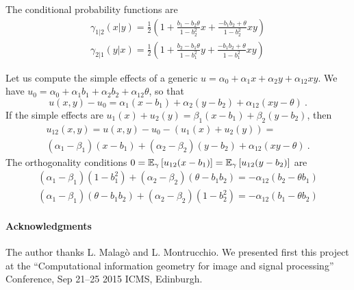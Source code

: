 \documentclass[runningheads]{llncs}
\begin{document}
The conditional probability functions are
\begin{gather*} \gamma_{1|2}(x|y) = \frac12 \left(1+\frac{b_1-b_2\theta}{1-b_2^2}x+\frac{-b_1b_2 + \theta}{1-b_2^2}xy\right) \\ \gamma_{2|1}(y|x) = \frac12 \left(1+\frac{b_2-b_1\theta}{1-b_1^2}y+\frac{-b_1b_2 + \theta}{1-b_1^2}xy\right) \end{gather*}

Let us compute the simple effects of a generic $u = \alpha_0 + \alpha_1 x + \alpha_2 y + \alpha_{12} xy$. We have $u_0 = \alpha_0 + \alpha_1 b_1 + \alpha_2 b_2 + \alpha_{12} \theta$, so that
\begin{equation*}
  u(x,y) - u_0 = \alpha_1 (x - b_1) + \alpha_2(y-b_2) + \alpha_{12} (xy - \theta) \ .
\end{equation*}
If the simple effects are $u_1(x) + u_2(y) = \beta_1 (x - b_1) + \beta_2(y-b_2)$, then
\begin{multline*}
  u_{12}(x,y) = u(x,y) - u_0 - (u_1(x) + u_2(y)) = \\ (\alpha_1-\beta_1)(x-b_1)+(\alpha_2-\beta_2)(y-b_2)+\alpha_{12}(xy-\theta) \ .  
\end{multline*}
The orthogonality conditions $0 = {\operatorname{\mathbb E}}_{\gamma}\left[u_{12}(x - b_1)\right] = {\operatorname{\mathbb E}}_{\gamma}\left[u_{12}(y-b_2)\right]$ are
\begin{gather*}
  (\alpha_1-\beta_1)(1-b_1^2)+(\alpha_2-\beta_2)(\theta-b_1b_2) = - \alpha_{12}(b_2-\theta b_1) \\
  (\alpha_1-\beta_1)(\theta-b_1b_2)+(\alpha_2-\beta_2)(1 - b_2^2)= - \alpha_{12}(b_1-\theta b_2)  
\end{gather*}

\paragraph{Acknowledgments}
The author thanks L. Malag\`o and L. Montrucchio. We presented first this project at the ``Computational information geometry for image and signal processing'' Conference, Sep 21--25 2015 ICMS, Edinburgh.

%


%
\end{document}
